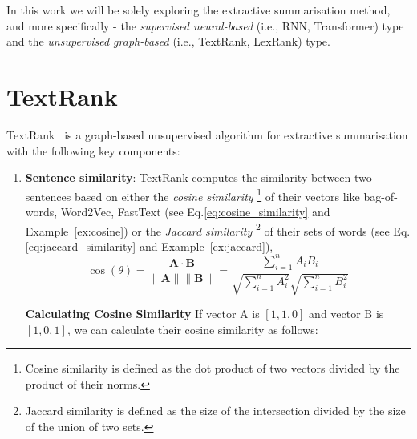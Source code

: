 In this work we will be solely exploring the extractive summarisation method, and more specifically - the \emph{supervised neural-based} (i.e., RNN, Transformer) type and the \emph{unsupervised graph-based} (i.e., TextRank, LexRank) type.

\section{TextRank}\label{sec:textrank}
TextRank~\cite{mihalcea-tarau-2004-textrank} is a graph-based unsupervised algorithm for extractive summarisation with the following key components:
\begin{enumerate}
    \item \textbf{Sentence similarity}: TextRank computes the similarity between two sentences based on either the \emph{cosine similarity}
        \footnote{
            Cosine similarity is defined as the dot product of two vectors divided by the product of their norms.
        } of their vectors like bag-of-words, Word2Vec, FastText (see Eq.\ref{eq:cosine_similarity} and Example~\ref{ex:cosine}) or the \emph{Jaccard similarity}
        \footnote{
            Jaccard similarity is defined as the size of the intersection divided by the size of the union of two sets.
        } of their sets of words (see Eq.\ref{eq:jaccard_similarity} and Example~\ref{ex:jaccard}),
        \begin{equation}\label{eq:cosine_similarity}
            \cos(\theta) = \frac{\mathbf{A} \cdot \mathbf{B}}{\|\mathbf{A}\| \|\mathbf{B}\|} = \frac{\sum_{i=1}^{n} A_i B_i}{\sqrt{\sum_{i=1}^{n} A_i^2} \sqrt{\sum_{i=1}^{n} B_i^2}}
        \end{equation}
        \begin{beaux_exemples}{\textbf{Calculating Cosine Similarity}}\label{ex:cosine}
            If vector A is $[1, 1, 0]$ and vector B is $[1, 0, 1]$, we can calculate their cosine similarity as follows:


\end{beaux_exemples}
\end{enumerate}
